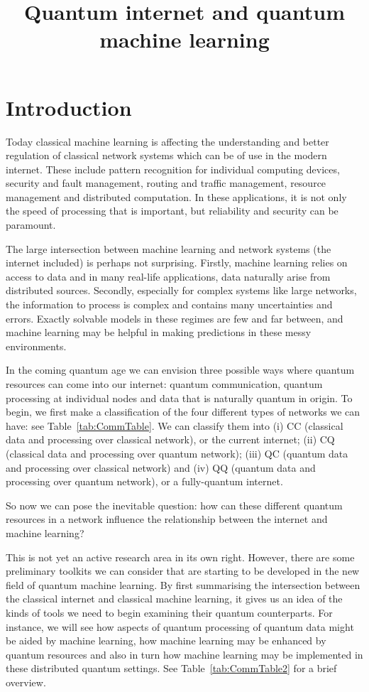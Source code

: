 \documentclass[twocolumn, aps, rmp, amsmath, amssymb, nofootinbib, superscriptaddress, longbibliography, floatfix, table-of-contents, eqsecnum]{revtex4-2}
\title{Quantum internet and quantum machine learning}
\begin{document}
\maketitle

\tableofcontents 

\section{Introduction}

Today classical machine learning is affecting the understanding and better regulation of classical network systems which can be of use in the modern internet. These include pattern recognition for individual computing devices, security and fault management, routing and traffic management, resource management and distributed computation. In these applications, it is not only the speed of processing that is important, but reliability and security can be paramount.

The large intersection between machine learning and network systems (the internet included) is perhaps not surprising. Firstly, machine learning relies on access to data and in many real-life applications, data naturally arise from distributed sources. Secondly, especially for complex systems like large networks, the information to process is complex and contains many uncertainties and errors. Exactly solvable models in these regimes are few and far between, and machine learning may be helpful in making predictions in these messy environments.

In the coming quantum age we can envision three possible ways where quantum resources can come into our internet: quantum communication, quantum processing at individual nodes and data that is naturally quantum in origin. To begin, we first make a classification of the four different types of networks we can have: see Table~\eqref{tab:CommTable}. We can classify them into (i) CC (classical data and processing over classical network), or the current internet; (ii) CQ (classical data and processing over quantum network); (iii) QC (quantum data and processing over classical network) and (iv) QQ (quantum data and processing over quantum network), or a fully-quantum internet.

So now we can pose the inevitable question: how can these different quantum resources in a network influence the relationship between the internet and machine learning?

This is not yet an active research area in its own right. However, there are some preliminary toolkits we can consider that are starting to be developed in the new field of quantum machine learning. By first summarising the intersection between the classical internet and classical machine learning, it gives us an idea of the kinds of tools we need to begin examining their quantum counterparts. For instance, we will see how aspects of quantum processing of quantum data might be aided by machine learning, how machine learning may be enhanced by quantum resources and also in turn how machine learning may be implemented in these distributed quantum settings. See Table~\eqref{tab:CommTable2} for a brief overview. 
\end{document}
